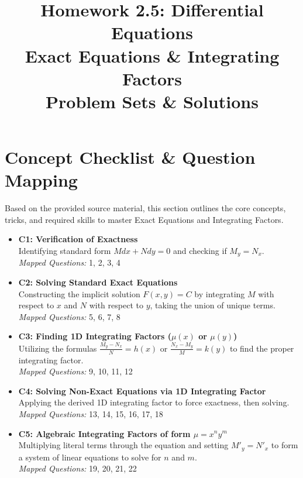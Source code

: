 \documentclass[11pt]{article}
\title{\textbf{Homework 2.5: Differential Equations \\ Exact Equations \& Integrating Factors} \\ \Large Problem Sets \& Solutions}
\author{}
\date{}
\begin{document}
\maketitle
\tableofcontents
\newpage

\section{Concept Checklist \& Question Mapping}
Based on the provided source material, this section outlines the core concepts, tricks, and required skills to master Exact Equations and Integrating Factors. 

\begin{itemize}
    \item \textbf{C1: Verification of Exactness} \\
    Identifying standard form $M dx + N dy = 0$ and checking if $M_y = N_x$. \\
    \textit{Mapped Questions:} 1, 2, 3, 4
    
    \item \textbf{C2: Solving Standard Exact Equations} \\
    Constructing the implicit solution $F(x,y) = C$ by integrating $M$ with respect to $x$ and $N$ with respect to $y$, taking the union of unique terms. \\
    \textit{Mapped Questions:} 5, 6, 7, 8
    
    \item \textbf{C3: Finding 1D Integrating Factors ($\mu(x)$ or $\mu(y)$)} \\
    Utilizing the formulas $\frac{M_y - N_x}{N} = h(x)$ or $\frac{N_x - M_y}{M} = k(y)$ to find the proper integrating factor. \\
    \textit{Mapped Questions:} 9, 10, 11, 12
    
    \item \textbf{C4: Solving Non-Exact Equations via 1D Integrating Factor} \\
    Applying the derived 1D integrating factor to force exactness, then solving. \\
    \textit{Mapped Questions:} 13, 14, 15, 16, 17, 18
    
    \item \textbf{C5: Algebraic Integrating Factors of form $\mu = x^n y^m$} \\
    Multiplying literal terms through the equation and setting $M'_y = N'_x$ to form a system of linear equations to solve for $n$ and $m$. \\
    \textit{Mapped Questions:} 19, 20, 21, 22
    

\end{itemize}
\end{document}

